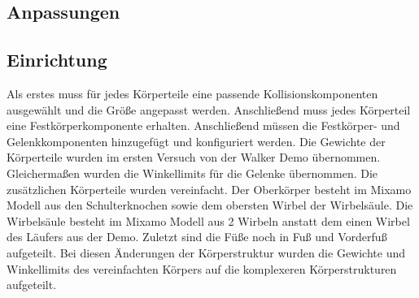 \subsection{Anpassungen}

\subsection{Einrichtung}



Als erstes muss für jedes Körperteile eine passende Kollisionskomponenten ausgewählt und die Größe angepasst werden. Anschließend muss jedes Körperteil eine Festkörperkomponente erhalten. Anschließend müssen die Festkörper- und Gelenkkomponenten hinzugefügt und konfiguriert werden. Die Gewichte der Körperteile wurden im ersten Versuch von der Walker Demo übernommen. Gleichermaßen wurden die Winkellimits für die Gelenke übernommen. Die zusätzlichen Körperteile wurden vereinfacht. Der Oberkörper besteht im Mixamo Modell aus den Schulterknochen sowie dem obersten Wirbel der Wirbelsäule. Die Wirbelsäule besteht im Mixamo Modell aus 2 Wirbeln anstatt dem einen Wirbel des Läufers aus der Demo. Zuletzt sind die Füße noch in Fuß und Vorderfuß aufgeteilt. Bei diesen Änderungen der Körperstruktur wurden die Gewichte und Winkellimits des vereinfachten Körpers auf die komplexeren Körperstrukturen aufgeteilt.

